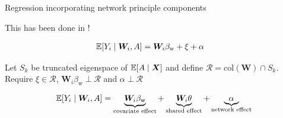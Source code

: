 \documentclass{beamer}
\theoremstyle{remark}
\newcommand{\X}{\bm X}
\newcommand{\W}{\bm W}
\DeclarePairedDelimiter{\brac}{[}{]}
\newcommand{\E}[2][]{%
   \ifthenelse{ \equal{#1}{} }
      {\ensuremath{\mathbb{E} \brac*{#2}}}
      {\ensuremath{\mathbb{E} \brac*{#2 \mid #1}}}
}
\begin{document}
\begin{frame}{Regression incorporating network principle components}

    This has been done in \cite{le_linear_2021}!

    \begin{align*}
        \E[\W_i, A]{Y_i} & = \W_i \beta_\text{w} + \xi + \alpha
    \end{align*}

    Let $S_k$ be truncated eigenspace of $\E[\X]{A}$ and define $\mathcal R = \mathrm{col}(\W) \cap S_k$. Require $\xi \in \mathcal R$, $\W_i \beta_\text{w} \perp \mathcal R$ and $\alpha \perp \mathcal R$

    \begin{align*}
        \E[\W_i, A]{Y_i} =
        \underbrace{\W_i \beta_\text{w}}_\text{covariate effect} +
        \underbrace{\W_i \theta}_\text{shared effect} +
        \underbrace{\alpha}_\text{network effect}
    \end{align*}
\end{frame}
\end{document}
